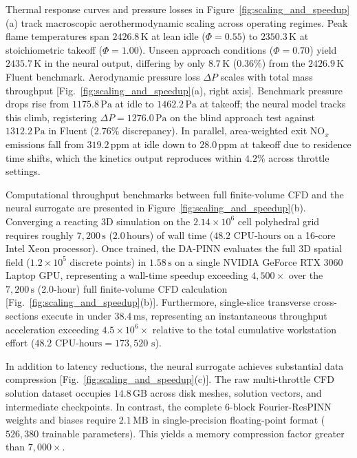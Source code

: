 \documentclass[reprint,aps,prfluids,superscriptaddress,twocolumn,floatfix]{revtex4-2}
\begin{document}
Thermal response curves and pressure losses in Figure~\ref{fig:scaling_and_speedup}(a) track macroscopic aerothermodynamic scaling across operating regimes. Peak flame temperatures span $2426.8\,\text{K}$ at lean idle ($\Phi = 0.55$) to $2350.3\,\text{K}$ at stoichiometric takeoff ($\Phi = 1.00$). Unseen approach conditions ($\Phi = 0.70$) yield $2435.7\,\text{K}$ in the neural output, differing by only $8.7\,\text{K}$ ($0.36\%$) from the $2426.9\,\text{K}$ Fluent benchmark. Aerodynamic pressure loss $\Delta P$ scales with total mass throughput [Fig.~\ref{fig:scaling_and_speedup}(a), right axis]. Benchmark pressure drops rise from $1175.8\,\text{Pa}$ at idle to $1462.2\,\text{Pa}$ at takeoff; the neural model tracks this climb, registering $\Delta P = 1276.0\,\text{Pa}$ on the blind approach test against $1312.2\,\text{Pa}$ in Fluent ($2.76\%$ discrepancy). In parallel, area-weighted exit $\text{NO}_x$ emissions fall from $319.2\,\text{ppm}$ at idle down to $28.0\,\text{ppm}$ at takeoff due to residence time shifts, which the kinetics output reproduces within $4.2\%$ across throttle settings.

\newpage

Computational throughput benchmarks between full finite-volume CFD and the neural surrogate are presented in Figure~\ref{fig:scaling_and_speedup}(b). Converging a reacting 3D simulation on the $2.14\times 10^6$ cell polyhedral grid requires roughly $7,200\,\text{s}$ ($2.0\,\text{hours}$) of wall time ($48.2\text{ CPU-hours}$ on a 16-core Intel Xeon processor). Once trained, the DA-PINN evaluates the full 3D spatial field ($1.2 \times 10^5$ discrete points) in $1.58\,\text{s}$ on a single NVIDIA GeForce RTX 3060 Laptop GPU, representing a wall-time speedup exceeding $4,500\times$ over the $7,200\,\text{s}$ (2.0-hour) full finite-volume CFD calculation [Fig.~\ref{fig:scaling_and_speedup}(b)]. Furthermore, single-slice transverse cross-sections execute in under $38.4\,\text{ms}$, representing an instantaneous throughput acceleration exceeding $4.5 \times 10^6\times$ relative to the total cumulative workstation effort ($48.2\text{ CPU-hours} = 173,520\text{ s}$).

In addition to latency reductions, the neural surrogate achieves substantial data compression [Fig.~\ref{fig:scaling_and_speedup}(c)]. The raw multi-throttle CFD solution dataset occupies $14.8\,\text{GB}$ across disk meshes, solution vectors, and intermediate checkpoints. In contrast, the complete 6-block Fourier-ResPINN weights and biases require $2.1\,\text{MB}$ in single-precision floating-point format ($526,380$ trainable parameters). This yields a memory compression factor greater than $7,000\times$.
\end{document}
